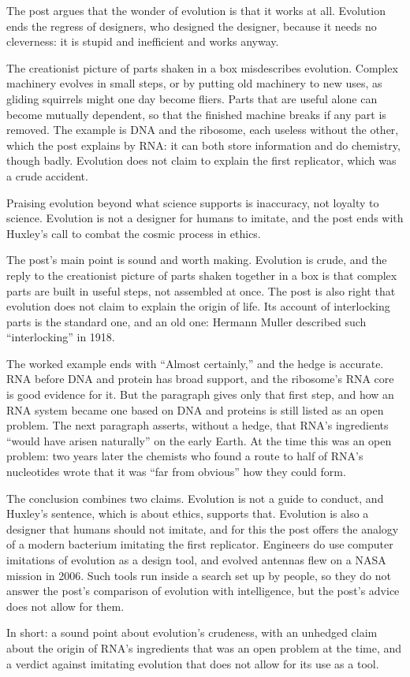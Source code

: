 \begin{afterword}
\summaryhead

The post argues that the wonder of evolution is that it works at all. Evolution ends the regress of designers, who designed the designer, because it needs no cleverness: it is stupid and inefficient and works anyway.

The creationist picture of parts shaken in a box misdescribes evolution. Complex machinery evolves in small steps, or by putting old machinery to new uses, as gliding squirrels might one day become fliers. Parts that are useful alone can become mutually dependent, so that the finished machine breaks if any part is removed. The example is DNA and the ribosome, each useless without the other, which the post explains by RNA: it can both store information and do chemistry, though badly. Evolution does not claim to explain the first replicator, which was a crude accident.

Praising evolution beyond what science supports is inaccuracy, not loyalty to science. Evolution is not a designer for humans to imitate, and the post ends with Huxley's call to combat the cosmic process in ethics.

\responsehead

The post's main point is sound and worth making. Evolution is crude, and the reply to the creationist picture of parts shaken together in a box is that complex parts are built in useful steps, not assembled at once. The post is also right that evolution does not claim to explain the origin of life. Its account of interlocking parts is the standard one, and an old one: Hermann Muller described such ``interlocking'' in 1918.

The worked example ends with ``Almost certainly,'' and the hedge is accurate. RNA before DNA and protein has broad support, and the ribosome's RNA core is good evidence for it. But the paragraph gives only that first step, and how an RNA system became one based on DNA and proteins is still listed as an open problem. The next paragraph asserts, without a hedge, that RNA's ingredients ``would have arisen naturally'' on the early Earth. At the time this was an open problem: two years later the chemists who found a route to half of RNA's nucleotides wrote that it was ``far from obvious'' how they could form.

The conclusion combines two claims. Evolution is not a guide to conduct, and Huxley's sentence, which is about ethics, supports that. Evolution is also a designer that humans should not imitate, and for this the post offers the analogy of a modern bacterium imitating the first replicator. Engineers do use computer imitations of evolution as a design tool, and evolved antennas flew on a NASA mission in 2006. Such tools run inside a search set up by people, so they do not answer the post's comparison of evolution with intelligence, but the post's advice does not allow for them.

In short: a sound point about evolution's crudeness, with an unhedged claim about the origin of RNA's ingredients that was an open problem at the time, and a verdict against imitating evolution that does not allow for its use as a tool.
\end{afterword}
